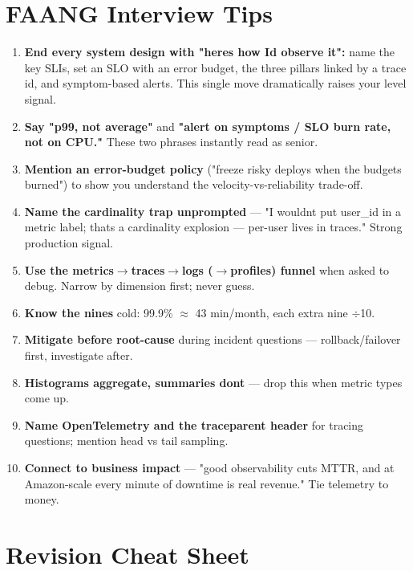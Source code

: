 \documentclass[11pt]{article}
\providecommand{\tightlist}{\setlength{\itemsep}{1pt}\setlength{\parskip}{0pt}}
\begin{document}
\section{FAANG Interview Tips}\label{faang-interview-tips}

\begin{enumerate}
\def\labelenumi{\arabic{enumi}.}
\tightlist
\item
  \textbf{End every system design with "here\textquotesingle s how I\textquotesingle d observe it":} name the key SLIs, set an SLO with an error budget, the three pillars linked by a trace id, and symptom-based alerts. This single move dramatically raises your level signal.
\item
  \textbf{Say "p99, not average"} and \textbf{"alert on symptoms / SLO burn rate, not on CPU."} These two phrases instantly read as senior.
\item
  \textbf{Mention an error-budget policy} ("freeze risky deploys when the budget\textquotesingle s burned") to show you understand the velocity-vs-reliability trade-off.
\item
  \textbf{Name the cardinality trap unprompted} --- "I wouldn\textquotesingle t put user\_id in a metric label; that\textquotesingle s a cardinality explosion --- per-user lives in traces." Strong production signal.
\item
  \textbf{Use the metrics\(\rightarrow\)traces\(\rightarrow\)logs (\(\rightarrow\)profiles) funnel} when asked to debug. Narrow by dimension first; never guess.
\item
  \textbf{Know the nines} cold: 99.9\% \(\approx\) 43 min/month, each extra nine \(\div\)10.
\item
  \textbf{Mitigate before root-cause} during incident questions --- rollback/failover first, investigate after.
\item
  \textbf{Histograms aggregate, summaries don\textquotesingle t} --- drop this when metric types come up.
\item
  \textbf{Name OpenTelemetry and the traceparent header} for tracing questions; mention head vs tail sampling.
\item
  \textbf{Connect to business impact} --- "good observability cuts MTTR, and at Amazon-scale every minute of downtime is real revenue." Tie telemetry to money.
\end{enumerate}

\section{Revision Cheat Sheet}\label{revision-cheat-sheet}
\end{document}
